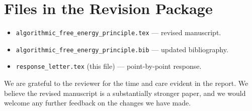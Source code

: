 \documentclass[11pt]{article}
\begin{document}
\section*{Files in the Revision Package}

\begin{itemize}
\item \texttt{algorithmic\_free\_energy\_principle.tex} --- revised manuscript.
\item \texttt{algorithmic\_free\_energy\_principle.bib} --- updated bibliography.
\item \texttt{response\_letter.tex} (this file) --- point-by-point response.
\end{itemize}

We are grateful to the reviewer for the time and care evident in the report. We believe the revised manuscript is a substantially stronger paper, and we would welcome any further feedback on the changes we have made.
\end{document}
